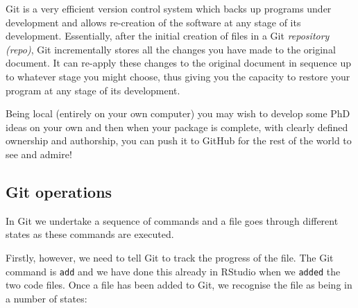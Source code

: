 \documentclass[titlepage]{book}\usepackage{knitr}
\begin{document}
Git is a very efficient version control system which backs up programs under development and allows re-creation of the software at any stage of its development.  Essentially, after the initial creation of files in a Git \emph{repository (repo)}, Git incrementally stores all the changes you have made to the original document.  It can re-apply these changes to the original document in sequence up to whatever stage you might choose, thus giving you the capacity to restore your program at any stage of its development.

Being local (entirely on your own computer) you may wish to develop some PhD ideas on your own and then when your package is complete, with clearly defined ownership and authorship, you can push it to GitHub for the rest of the world to see and admire!


\subsection{Git operations}

In Git we undertake a sequence of commands and a file goes through different states as these commands are executed.

Firstly, however, we need to tell Git to track the progress of the file. The Git command is \texttt{add} and we have done this already in RStudio when we \texttt{added} the two code files. Once a file has been added to Git, we recognise the file as being in a number of states:
\end{document}
